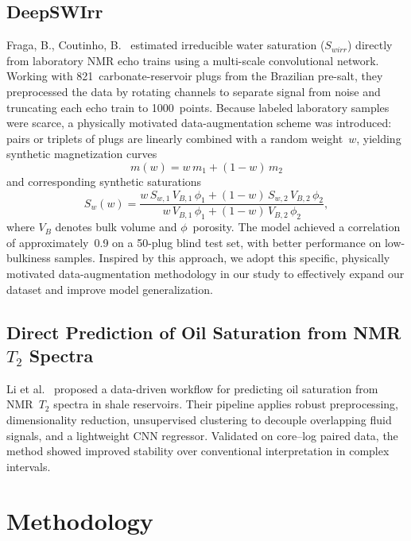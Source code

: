 \documentclass[runningheads]{llncs}
\begin{document}
\subsection{DeepSWIrr}


Fraga, B., Coutinho, B.~\cite{ref_fraga2025} estimated irreducible water saturation ($S_{wirr}$)
directly from laboratory NMR echo trains using a multi-scale convolutional network.
Working with 821~carbonate-reservoir plugs from the Brazilian pre-salt, they preprocessed
the data by rotating channels to separate signal from noise and truncating each echo train
to 1000~points. Because labeled laboratory samples were scarce, a physically motivated
data-augmentation scheme was introduced: pairs or triplets of plugs are linearly combined
with a random weight~$w$, yielding synthetic magnetization curves
\begin{equation}
  m(w) = w\,m_1 + (1-w)\,m_2
  \label{eq:aug_m}
\end{equation}
and corresponding synthetic saturations
\begin{equation}
  S_w(w) =
  \frac{w\,S_{w,1}\,V_{B,1}\,\phi_1 + (1-w)\,S_{w,2}\,V_{B,2}\,\phi_2}
       {w\,V_{B,1}\,\phi_1 + (1-w)\,V_{B,2}\,\phi_2},
  \label{eq:aug_sw}
\end{equation}
where $V_B$ denotes bulk volume and $\phi$~porosity.
The model achieved a correlation of approximately~0.9 on a 50-plug blind test set,
with better performance on low-bulkiness samples. Inspired by this approach, we adopt this specific, physically motivated data-augmentation methodology in our study to effectively expand our dataset and improve model generalization.

\subsection{Direct Prediction of Oil Saturation from NMR $T_2$ Spectra}
Li et al.~\cite{ref_li2026} proposed a data-driven workflow for predicting oil saturation
from NMR~$T_2$ spectra in shale reservoirs. Their pipeline applies robust preprocessing,
dimensionality reduction, unsupervised clustering to decouple overlapping fluid signals,
and a lightweight CNN regressor. Validated on core--log paired data, the method showed
improved stability over conventional interpretation in complex intervals.


\section{Methodology}
\label{sec:method}
\end{document}
